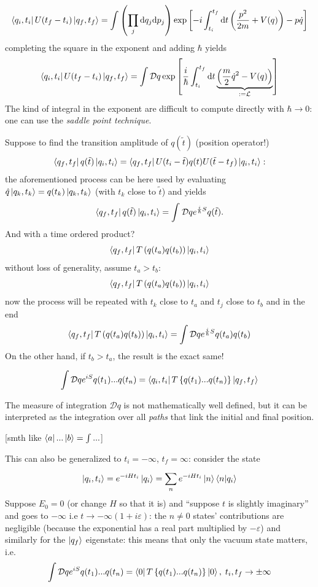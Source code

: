 $$\bra{q_i,t_i}U(t_f-t_i)\ket{q_f,t_f} = 
\int \left(\prod_{j}^{}\dd q_j\dd p_j\right)\exp\left[-i
\int_{t_i}^{t_f} \dd t \left(\frac{p^2}{2m}+V(q)\right) - p\dot q \right]
$$
completing the square in the exponent and adding $\hbar$ yields
$$\bra{q_i,t_i}U(t_f-t_i)\ket{q_f,t_f} = \int \mathcal{D}q \exp\left[
\frac{i}{\hbar} \int_{t_i}^{t_f} \dd t
\underbrace{\left(\frac{m}{2}\dot q^2 -V(q)\right)}_{:=\mathcal{L}}\right]$$
The kind of integral in the exponent are difficult to compute directly with
$\hbar\to0$: one can use the \textit{saddle point technique}.

Suppose to find the transition amplitude of $q(\tilde t)$ (position operator!)
$$\bra{q_f,t_f}q(\tilde t)\ket{q_i,t_i} = \bra{q_f,t_f}U(t_i-\tilde t)q(t)U(
\tilde t-t_f)\ket{q_i,t_i}:$$
the aforementioned process can be here used by evaluating $\hat q\ket{q_k,t_k} = 
q(t_k)\ket{q_k,t_k}$ (with $t_k$ close to $\tilde t$) and yields
$$\bra{q_f,t_f}q(\tilde t)\ket{q_i,t_i}=\int_{}^{} \mathcal{D}q e^{
\frac{i}{\hbar}S}q(\tilde t).$$
And with a time ordered product?
$$\bra{q_f,t_f}T\left(q(t_a)q(t_b)\right)\ket{q_i,t_i}$$
without loss of generality, assume $t_a>t_b$:
$$\bra{q_f,t_f}T\left(q(t_a)q(t_b)\right)\ket{q_i,t_i}$$
now the process will be repeated with $t_k$ close to $t_a$ and $t_j$ close to
$t_b$ and in the end
$$\bra{q_f,t_f}T\left(q(t_a)q(t_b)\right)\ket{q_i,t_i}=\int \mathcal{D}q
e^{\frac{i}{\hbar}S}q(t_a)q(t_b)$$
On the other hand, if $t_b>t_a$, the result is the exact same! 

$$\int \mathcal{D}q e^{iS} q(t_1)...q(t_n) = \bra{q_i,t_i} T\left\{q(t_1)...q(t_n)
\right\}\ket{q_f,t_f}$$

The measure of integration $\mathcal{D}q$ is not mathematically well defined, but
it can be interpreted as the integration over all \textit{paths} that
link the initial and final position.

[smth like $\bra{a}...\ket{b} = \int...$]

This can also be generalized to $t_i=-\infty$, $t_f=\infty$: consider the state
$$\ket{q_i,t_i}=e^{-iHt_i}\ket{q_i}=\sum_{n}^{}e^{-iHt_i}\ket{n}\bra{n}\ket{q_i}$$
Suppose $E_0=0$ (or change $H$ so that it is) and ``suppose $t$ is slightly
imaginary'' and goes to $-\infty$ i.e $t\to -\infty(1+i\varepsilon)$: the
$n\neq0$ states' contributions are negligible (because the exponential
has a real part multiplied by $-\varepsilon $)
and similarly for the $\ket{q_f}$ eigenstate: this means that only the vacuum
state matters, i.e.
$$\int \mathcal{D}q e^{iS} q(t_1)...q(t_n) = \bra{0}T\left\{q(t_1)...q(t_n)
\right\}\ket{0},\; t_i,t_f\to\pm\infty$$
